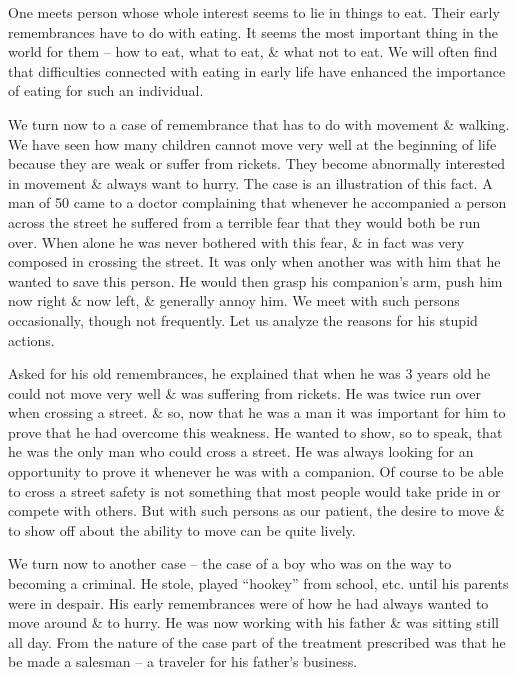 \documentclass{article}
\begin{document}
One meets person whose whole interest seems to lie in things to eat. Their early remembrances have to do with eating. It seems the most important thing in the world for them -- how to eat, what to eat, \& what not to eat. We will often find that difficulties connected with eating in early life have enhanced the importance of eating for such an individual.

We turn now to a case of remembrance that has to do with movement \& walking. We have seen how many children cannot move very well at the beginning of life because they are weak or suffer from rickets. They become abnormally interested in movement \& always want  to hurry. The case is an illustration of this fact. A man of 50 came to a doctor complaining that whenever he accompanied a person across the street he suffered from a terrible fear that they would both be run over. When alone he was never bothered with this fear, \& in fact was very composed in crossing the street. It was only when another was with him that he wanted to save this person. He would then grasp his companion's arm, push him now right \& now left, \& generally annoy him. We meet with such persons occasionally, though not frequently. Let us analyze the reasons for his stupid actions.

Asked for his old remembrances, he explained that when he was 3 years old he could not move very well \& was suffering from rickets. He was twice run over when crossing a street. \& so, now that he was a man it was important for him to prove that he had overcome this weakness. He wanted to show, so to speak, that he was the only man who could cross a street. He was always looking for an opportunity to prove it whenever he was with a companion. Of course to be able to cross a street safety is not something that most people would take pride in or compete with others. But with such persons as our patient, the desire to move \& to show off about the ability to move can be quite lively.

We turn now to another case -- the case of a boy who was on the way to becoming a criminal. He stole, played ``hookey'' from school, etc. until his parents were in despair. His early remembrances were of how he had always wanted to move around \& to hurry. He was now working with his father \& was sitting still all day. From the nature of the case part of the treatment prescribed was that he be made a salesman -- a traveler for his father's business.
\end{document}
